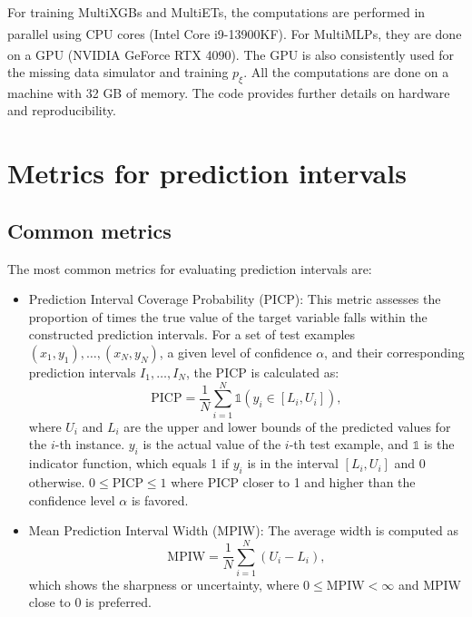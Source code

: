 \documentclass{article}
\begin{document}
\begin{appendix}
For training MultiXGBs and MultiETs, the computations are performed in parallel using CPU cores (Intel\textsuperscript{\tiny\textregistered} Core\textsuperscript{\tiny\texttrademark} i9-13900KF). For MultiMLPs, they are done on a GPU (NVIDIA\textsuperscript{\tiny\textregistered} GeForce RTX\textsuperscript{\tiny\texttrademark} 4090). The GPU is also consistently used for the missing data simulator and training $p_\xi$. All the computations are done on a machine with 32 GB of memory. The code provides further details on hardware and reproducibility.

\section{Metrics for prediction intervals}
\label{appendix:metrics}
\subsection{Common metrics}
\label{appendix:common-metrics}
The most common metrics for evaluating prediction intervals \cite{pearce2018high,zhou2023real} are:
\begin{itemize}
    \item Prediction Interval Coverage Probability (PICP): This metric assesses the proportion of times the true value of the target variable falls within the constructed prediction intervals. For a set of test examples ${(x_1, y_1), \ldots, (x_N, y_N)}$, a given level of confidence $\alpha$, and their corresponding prediction intervals ${I_1, \ldots, I_N}$, the PICP is calculated as:
    \begin{equation}
    \text{PICP} = \frac{1}{N}\sum_{i=1}^{N}\mathds{1}(y_i \in [L_i, U_i]),
    \end{equation}
    where $U_i$ and $L_i$ are the upper and lower bounds of the predicted values for the $i$-th instance. $y_i$ is the actual value of the $i$-th test example, and $\mathds{1}$ is the indicator function, which equals 1 if $y_i$ is in the interval $[L_i,U_i]$ and 0 otherwise. $0 \leq \text{{PICP}} \leq 1$ where PICP closer to 1 and higher than the confidence level $\alpha$ is favored.
    \item Mean Prediction Interval Width (MPIW): The average width is computed as
    \begin{equation}
        \text{MPIW} = \frac{1}{N} \sum_{i=1}^{N} (U_i - L_i),
    \end{equation}
    which shows the sharpness or uncertainty, where $0 \leq \text{{MPIW}} < \infty$ and MPIW close to 0 is preferred.
    

\end{itemize}
\end{appendix}
\end{document}
